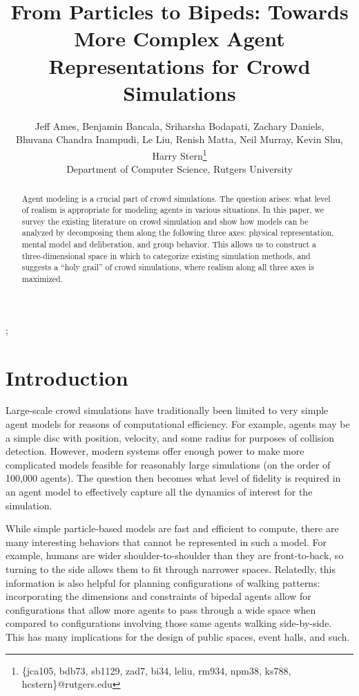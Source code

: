 \documentclass[tog]{acmsiggraph}
\title{From Particles to Bipeds: Towards More Complex Agent Representations for Crowd Simulations}
\author{Jeff Ames, Benjamin Bancala, Sriharsha Bodapati, Zachary Daniels, \\
        Bhuvana Chandra Inampudi, Le Liu, Renish Matta, Neil Murray, Kevin Shu, Harry Stern\thanks{
          \{jca105, bdb73, sb1129, zad7, bi34, leliu, rm934, npm38, ks788, hcstern\}@rutgers.edu} \\
        Department of Computer Science, Rutgers University}
\begin{document}

\maketitle

\begin{abstract}
Agent modeling is a crucial part of crowd simulations. The question arises: what level of realism is appropriate for modeling agents in various situations. In this paper, we survey the existing literature on crowd simulation and show how models can be analyzed by decomposing them along the following three axes: physical representation, mental model and deliberation, and group behavior. This allows us to construct a three-dimensional space in which to categorize existing simulation methods, and suggests a ``holy grail'' of crowd simulations, where realism along all three axes is maximized.
\end{abstract}

\begin{CRcatlist}
  ;
\end{CRcatlist}

\keywordlist


\section{Introduction}

Large-scale crowd simulations have traditionally been limited to very simple agent models for reasons of computational efficiency. For example, agents may be a simple disc with position, velocity, and some radius for purposes of collision detection. However, modern systems offer enough power to make more complicated models feasible for reasonably large simulations (on the order of 100,000 agents). The question then becomes what level of fidelity is required in an agent model to effectively capture all the dynamics of interest for the simulation.

While simple particle-based models are fast and efficient to compute, there are many interesting behaviors that cannot be represented in such a model. For example, humans are wider shoulder-to-shoulder than they are front-to-back, so turning to the side allows them to fit through narrower spaces. Relatedly, this information is also helpful for planning configurations of walking patterns: incorporating the dimensions and constraints of bipedal agents allow for configurations that allow more agents to pass through a wide space when compared to configurations involving those same agents walking side-by-side. This has many implications for the design of public spaces, event halls, and such.
\end{document}
